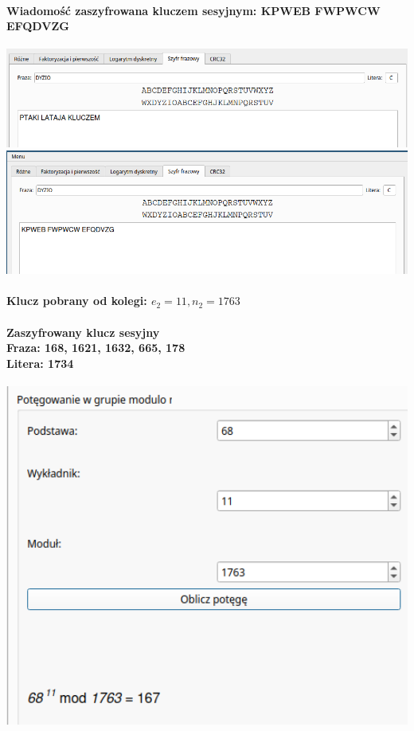\documentclass{article}[12pt]
\begin{document}
\paragraph{Wiadomość zaszyfrowana kluczem sesyjnym: KPWEB FWPWCW EFQDVZG \\}
\includegraphics[width=1\textwidth]{four.png}
\includegraphics[width=1\textwidth]{five.png}
\paragraph{Klucz pobrany od kolegi:  $e_2 = 11, n_2 = 1763$}
\paragraph{Zaszyfrowany klucz sesyjny \\ Fraza: 168, 1621, 1632, 665, 178 \\ Litera: 1734 \\}
\includegraphics[width=1\textwidth]{six.png}
\end{document}
